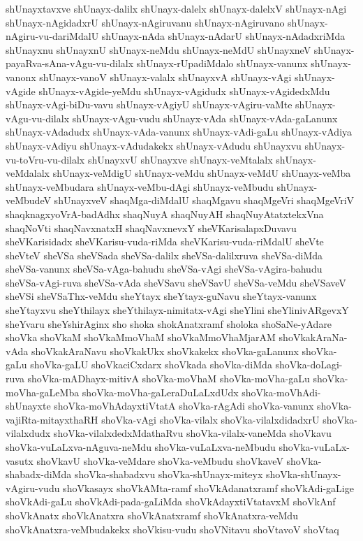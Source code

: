 {shUnayxtavxve
shUnayx-dalilx
shUnayx-dalelx
shUnayx-dalelxV
shUnayx-nAgi
shUnayx-nAgidadxrU
shUnayx-nAgiruvanu
shUnayx-nAgiruvano
shUnayx-nAgiru-vu-dariMdalU
shUnayx-nAda
shUnayx-nAdarU
shUnayx-nAdadxriMda
shUnayxnu
shUnayxnU
shUnayx-neMdu
shUnayx-neMdU
shUnayxneV
shUnayx-payaRva-sAna-vAgu-vu-dilalx
shUnayx-rUpadiMdalo
shUnayx-vanunx
shUnayx-vanonx
shUnayx-vanoV
shUnayx-valalx
shUnayxvA
shUnayx-vAgi
shUnayx-vAgide
shUnayx-vAgide-yeMdu
shUnayx-vAgidudx
shUnayx-vAgidedxMdu
shUnayx-vAgi-biDu-vavu
shUnayx-vAgiyU
shUnayx-vAgiru-vaMte
shUnayx-vAgu-vu-dilalx
shUnayx-vAgu-vudu
shUnayx-vAda
shUnayx-vAda-gaLanunx
shUnayx-vAdadudx
shUnayx-vAda-vanunx
shUnayx-vAdi-gaLu
shUnayx-vAdiya
shUnayx-vAdiyu
shUnayx-vAdudakekx
shUnayx-vAdudu
shUnayxvu
shUnayx-vu-toVru-vu-dilalx
shUnayxvU
shUnayxve
shUnayx-veMtalalx
shUnayx-veMdalalx
shUnayx-veMdigU
shUnayx-veMdu
shUnayx-veMdU
shUnayx-veMba
shUnayx-veMbudara
shUnayx-veMbu-dAgi
shUnayx-veMbudu
shUnayx-veMbudeV
shUnayxveV
shaqMga-diMdalU
shaqMgavu
shaqMgeVri
shaqMgeVriV
shaqknagxyoVrA-badAdhx
shaqNuyA
shaqNuyAH
shaqNuyAtatxtekxVna
shaqNoVti
shaqNavxnatxH
shaqNavxnevxY
sheVKarisalapxDuvavu
sheVKarisidadx
sheVKarisu-vuda-riMda
sheVKarisu-vuda-riMdalU
sheVte
sheVteV
sheVSa
sheVSada
sheVSa-dalilx
sheVSa-dalilxruva
sheVSa-diMda
sheVSa-vanunx
sheVSa-vAga-bahudu
sheVSa-vAgi
sheVSa-vAgira-bahudu
sheVSa-vAgi-ruva
sheVSa-vAda
sheVSavu
sheVSavU
sheVSa-veMdu
sheVSaveV
sheVSi
sheVSaThx-veMdu
sheYtayx
sheYtayx-guNavu
sheYtayx-vanunx
sheYtayxvu
sheYthilayx
sheYthilayx-nimitatx-vAgi
sheYlini
sheYlinivARgevxY
sheYvaru
sheYshirAginx
sho
shoka
shokAnatxramf
sholoka
shoSaNe-yAdare
shoVka
shoVkaM
shoVkaMmoVhaM
shoVkaMmoVhaMjarAM
shoVkakAraNa-vAda
shoVkakAraNavu
shoVkakUkx
shoVkakekx
shoVka-gaLanunx
shoVka-gaLu
shoVka-gaLU
shoVkaciCxdarx
shoVkada
shoVka-diMda
shoVka-doLagi-ruva
shoVka-mADhayx-mitivA
shoVka-moVhaM
shoVka-moVha-gaLu
shoVka-moVha-gaLeMba
shoVka-moVha-gaLeraDuLaLxdUdx
shoVka-moVhAdi-shUnayxte
shoVka-moVhAdayxtiVtatA
shoVka-rAgAdi
shoVka-vanunx
shoVka-vajiRta-mitayxthaRH
shoVka-vAgi
shoVka-vilalx
shoVka-vilalxdidadxrU
shoVka-vilalxdudx
shoVka-vilalxdedxMdathaRvu
shoVka-vilalx-vaneMda
shoVkavu
shoVka-vuLaLxva-nAguva-neMdu
shoVka-vuLaLxva-neMbudu
shoVka-vuLaLx-vasutx
shoVkavU
shoVka-veMdare
shoVka-veMbudu
shoVkaveV
shoVka-shabadx-diMda
shoVka-shabadxvu
shoVka-shUnayx-miteyx
shoVka-shUnayx-vAgiru-vudu
shoVkasayx
shoVkAMta-ramf
shoVkAdanatxramf
shoVkAdi-gaLige
shoVkAdi-gaLu
shoVkAdi-pada-gaLiMda
shoVkAdayxtiVtatavxM
shoVkAnf
shoVkAnatx
shoVkAnatxra
shoVkAnatxramf
shoVkAnatxra-veMdu
shoVkAnatxra-veMbudakekx
shoVkisu-vudu
shoVNitavu
shoVtavoV
shoVtaq
}
